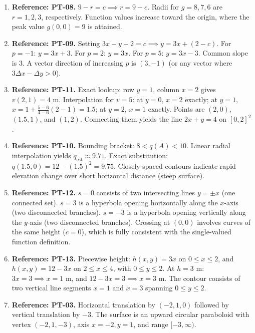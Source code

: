 \documentclass[11pt,letterpaper]{article}
\begin{document}
\begin{enumerate}[label=\textbf{A\arabic*.},leftmargin=*]
    \item \textbf{Reference: PT-08.} $9 - r = c \implies r = 9 - c$. Radii for $g = 8, 7, 6$ are $r = 1, 2, 3$, respectively. Function values increase toward the origin, where the peak value $g(0,0)=9$ is attained.
    
    \item \textbf{Reference: PT-09.} Setting $3x - y + 2 = c \implies y = 3x + (2-c)$.
    For $p = -1$: $y = 3x + 3$.
    For $p = 2$: $y = 3x$.
    For $p = 5$: $y = 3x - 3$.
    Common slope is $3$. A vector direction of increasing $p$ is $(3, -1)$ (or any vector where $3\Delta x - \Delta y > 0$).
    
    \item \textbf{Reference: PT-11.} Exact lookup: row $y=1$, column $x=2$ gives $v(2,1) = 4$ m.
    Interpolation for $v=5$: at $y=0$, $x=2$ exactly; at $y=1$, $x = 1 + \frac{5-6}{4-6}(2-1) = 1.5$; at $y=2$, $x=1$ exactly.
    Points are $(2,0)$, $(1.5,1)$, and $(1,2)$. Connecting them yields the line $2x + y = 4$ on $[0,2]^2$.
    
    \item \textbf{Reference: PT-10.} Bounding bracket: $8 < q(A) < 10$. Linear radial interpolation yields $q_{\text{est}} \approx 9.71$. Exact substitution: $q(1.5,0) = 12 - (1.5)^2 = 9.75$. Closely spaced contours indicate rapid elevation change over short horizontal distance (steep surface).
    
    \item \textbf{Reference: PT-12.} $s = 0$ consists of two intersecting lines $y = \pm x$ (one connected set). $s = 3$ is a hyperbola opening horizontally along the $x$-axis (two disconnected branches). $s = -3$ is a hyperbola opening vertically along the $y$-axis (two disconnected branches). Crossing at $(0,0)$ involves curves of the same height ($c=0$), which is fully consistent with the single-valued function definition.
    
    \item \textbf{Reference: PT-13.} Piecewise height: $h(x,y) = 3x$ on $0 \le x \le 2$, and $h(x,y) = 12 - 3x$ on $2 \le x \le 4$, with $0 \le y \le 2$. At $h = 3$ m: $3x = 3 \implies x = 1$ m, and $12 - 3x = 3 \implies x = 3$ m. The contour consists of two vertical line segments $x = 1$ and $x = 3$ spanning $0 \le y \le 2$.
    
    \item \textbf{Reference: PT-03.} Horizontal translation by $(-2, 1, 0)$ followed by vertical translation by $-3$. The surface is an upward circular paraboloid with vertex $(-2, 1, -3)$, axis $x=-2, y=1$, and range $[-3, \infty)$.
    

\end{enumerate}
\end{document}
